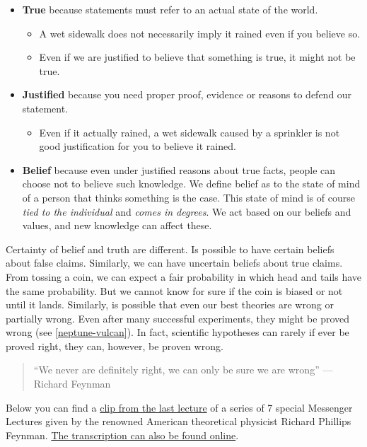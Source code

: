 \documentclass[
]{book}
\providecommand{\tightlist}{%
  \setlength{\itemsep}{0pt}\setlength{\parskip}{0pt}}
\begin{document}
\begin{itemize}
\tightlist
\item
  \textbf{True} because statements must refer to an actual state of the world.

  \begin{itemize}
  \tightlist
  \item
    A wet sidewalk does not necessarily imply it rained even if you believe so.
  \item
    Even if we are justified to believe that something is true, it might not be true.
  \end{itemize}
\item
  \textbf{Justified} because you need proper proof, evidence or reasons to defend our statement.

  \begin{itemize}
  \tightlist
  \item
    Even if it actually rained, a wet sidewalk caused by a sprinkler is not good justification for you to believe it rained.
  \end{itemize}
\item
  \textbf{Belief} because even under justified reasons about true facts, people can choose not to believe such knowledge. We define belief as to the state of mind of a person that thinks something is the case. This state of mind is of course \emph{tied to the individual} and \emph{comes in degrees}. We act based on our beliefs and values, and new knowledge can affect these.
\end{itemize}

Certainty of belief and truth are different. Is possible to have certain beliefs about false claims.
Similarly, we can have uncertain beliefs about true claims. From tossing a coin, we can expect a fair probability in which head and tails have the same probability. But we cannot know for sure if the coin is biased or not until it lands. Similarly, is possible that even our best theories are wrong or partially wrong. Even after many successful experiments, they might be proved wrong (see \ref{neptune-vulcan}). In fact, scientific hypotheses can rarely if ever be proved right, they can, however, be proven wrong.

\begin{quote}
``We never are definitely right, we can only be sure we are wrong'' --- Richard Feynman
\end{quote}

Below you can find a \href{https://youtu.be/ECY-4Ng9Nkc?t=1190}{clip from the last lecture} of a series of 7 special Messenger Lectures given by the renowned American theoretical physicist Richard Phillips Feynman. \href{https://sites.google.com/site/barrykort/feynman-on-the-scientific-method}{The transcription can also be found online}.
\end{document}
